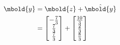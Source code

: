 \documentclass[12pt letter]{report}
\begin{document}
{\begin{align*}
    \mbold{y}       & = \mbold{z} + \hat{\mbold{y}}                                                                   \\
                    & = \begin{bmatrix} -\frac{7}{3} \\
                          \frac{7}{3}  \\ \frac{7}{3}\end{bmatrix}+   \begin{bmatrix}
                                                                      \frac{10}{3} \\
                                                                      \frac{2}{3}  \\
                                                                      \frac{8}{3}
                                                                    \end{bmatrix}                                    \\
  \end{align*}
}
\end{document}
